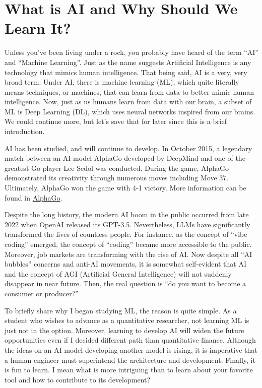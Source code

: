 \documentclass[../../../main.tex]{subfiles}
\begin{document}
\chapter*{What is AI and Why Should We Learn It?}

Unless you've been living under a rock, you probably have heard of
the term ``AI'' and ``Machine Learning''. Just as the name suggests
Artificial Intelligence is any technology that mimics human
intelligence. That being said, AI is a very, very broad term.
Under AI, there is machine learning (ML), which quite literally
means techniques, or machines, that can learn from data to better
mimic human intelligence. Now, just as us humans learn from data
with our brain, a subset of ML is Deep Learning (DL), which uses
neural networks inspired from our brains. We could continue more,
but let's save that for later since this is a brief introduction.

AI has been studied, and will continue to develop. In October 2015,
a legendary match between an AI model AlphaGo developed by DeepMind
and one of the greatest Go player Lee Sedol was conducted. During
the game, AlphaGo demonstrated its creativity through numerous
moves including Move 37. Ultimately, AlphaGo won the game with
4-1 victory. More information can be found in
\href{https://deepmind.google/research/alphago/}{AlphaGo}.

Despite the long history, the modern AI boom in the public
occurred from late 2022 when OpenAI released its GPT-3.5.
Nevertheless, LLMs have significantly transformed the lives of
countless people. For instance, as the concept of ``vibe coding''
emerged, the concept of ``coding'' became more accessible to the
public. Moreover, job markets are transforming with the rise of
AI. Now despite all ``AI bubbles'' concerns and anti-AI movements,
it is somewhat self-evident that AI and the concept of AGI
(Artificial General Intelligence) will not suddenly disappear
in near future. Then, the real question is ``do you want to
become a consumer or producer?''

To briefly share why I began studying ML, the reason is quite
simple. As a student who wishes to advance as a quantitative
researcher, not learning ML is just not in the option. Moreover,
learning to develop AI will widen the future opportunities even
if I decided different path than quantitative finance. Although
the ideas on an AI model developing another model is rising,
it is imperative that a human engineer must superintend the
architecture and development. Finally, it is fun to learn.
I mean what is more intriguing than to learn about your favorite
tool and how to contribute to its development?
\end{document}
